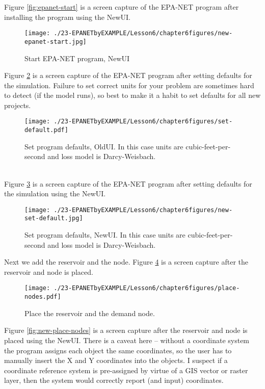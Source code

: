 Figure \ref{fig:epanet-start} is a screen capture of the EPA-NET program after installing the program using the NewUI. 
\begin{figure}[htbp] %
   \centering
   \texttt{[image: ./23-EPANETbyEXAMPLE/Lesson6/chapter6figures/new-epanet-start.jpg]} 
   \caption{Start EPA-NET program, NewUI}
   \label{fig:new-epanet-start}
\end{figure}
\clearpage
Figure \ref{fig:set-default} is a screen capture of the EPA-NET program after setting defaults for the simulation.   Failure to set correct units for your problem are sometimes hard to detect (if the model runs), so best to make it a habit to set defaults for all new projects.
\begin{figure}[h!] %
   \centering
   \texttt{[image: ./23-EPANETbyEXAMPLE/Lesson6/chapter6figures/set-default.pdf]} 
   \caption{Set program defaults, OldUI.  In this case units are cubic-feet-per-second and loss model is Darcy-Weisbach.}
   \label{fig:set-default}
\end{figure}
\\Figure \ref{fig:new-set-default} is a screen capture of the EPA-NET program after setting defaults for the simulation using the NewUI.
\begin{figure}[h!] %
   \centering
   \texttt{[image: ./23-EPANETbyEXAMPLE/Lesson6/chapter6figures/new-set-default.jpg]} 
   \caption{Set program defaults, NewUI.  In this case units are cubic-feet-per-second and loss model is Darcy-Weisbach.}
   \label{fig:new-set-default}
\end{figure}
\clearpage

Next we add the reservoir and the node.   
Figure \ref{fig:place-nodes} is a screen capture after the reservoir and node is placed.
\begin{figure}[h!] %
   \centering
   \texttt{[image: ./23-EPANETbyEXAMPLE/Lesson6/chapter6figures/place-nodes.pdf]} 
   \caption{Place the reservoir and the demand node.}
   \label{fig:place-nodes}
\end{figure}
\newline Figure \ref{fig:new-place-nodes} is a screen capture after the reservoir and node is placed using the NewUI. 
There is a caveat here -- without a coordinate system the program assigns each object the same coordinates, so the user has to manually insert the X and Y coordinates into the objects.  I suspect if a coordinate reference system is pre-assigned by virtue of a GIS vector or raster layer, then the system would correctly report (and input) coordinates.

